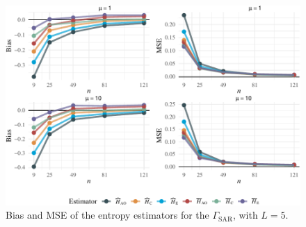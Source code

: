 \documentclass[remotesensing,article,submit,moreauthors,pdftex]{Definitions/mdpi}
\providecommand{\DIFaddbeginFL}{} %
\providecommand{\DIFaddendFL}{} %
\providecommand{\DIFdelbeginFL}{} %
\providecommand{\DIFdelendFL}{} %
\newcommand{\DIFscaledelfig}{0.5}
\newlength{\DIFdelgraphicswidth} %
\newlength{\DIFdelgraphicsheight} %
\newcommand{\DIFaddincludegraphics}[2][]{{\color{blue}\fbox{\DIFOincludegraphics[#1]{#2}}}} %
\newcommand{\DIFdelincludegraphics}[2][]{%
\sbox{\DIFdelgraphicsbox}{\DIFOincludegraphics[#1]{#2}}%
\settoboxwidth{\DIFdelgraphicswidth}{\DIFdelgraphicsbox} %
\settoboxtotalheight{\DIFdelgraphicsheight}{\DIFdelgraphicsbox} %
\scalebox{\DIFscaledelfig}{%
\parbox[b]{\DIFdelgraphicswidth}{\usebox{\DIFdelgraphicsbox}\\[-\baselineskip] \rule{\DIFdelgraphicswidth}{0em}}\llap{\resizebox{\DIFdelgraphicswidth}{\DIFdelgraphicsheight}{%
\setlength{\unitlength}{\DIFdelgraphicswidth}%
\begin{picture}(1,1)%
\thicklines\linethickness{2pt} %
{\color[rgb]{1,0,0}\put(0,0){\framebox(1,1){}}}%
{\color[rgb]{1,0,0}\put(0,0){\line( 1,1){1}}}%
{\color[rgb]{1,0,0}\put(0,1){\line(1,-1){1}}}%
\end{picture}%
}\hspace*{3pt}}} %
} %
\DeclareRobustCommand{\DIFaddbeginFL}{\DIFOaddbeginFL \let\includegraphics\DIFaddincludegraphics} %
\DeclareRobustCommand{\DIFaddendFL}{\DIFOaddendFL \let\includegraphics\DIFOincludegraphics} %
\DeclareRobustCommand{\DIFdelbeginFL}{\DIFOdelbeginFL \let\includegraphics\DIFdelincludegraphics} %
\DeclareRobustCommand{\DIFdelendFL}{\DIFOaddendFL \let\includegraphics\DIFOincludegraphics} %
\begin{document}
\begin{figure}[hbt]
\DIFdelbeginFL %
\DIFdelendFL \DIFaddbeginFL \includegraphics[width=0.95\linewidth]{R1-Identifying-Heterogeneity-in-SAR-Data-with-New-Test-Statistics_files/figure-latex/Plot_bias_mse_gi0-1} \DIFaddendFL \caption{Bias and MSE of the entropy estimators for the $\Gamma_{\text{SAR}}$, with $L=5$.}\label{fig:Plot_bias_mse_gi0}
\end{figure}
\end{document}
